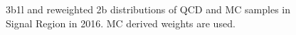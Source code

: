 \begin{figure}[ht]
 

    \caption{3b1l and reweighted 2b distributions of QCD and \ttbar MC samples in Signal Region in 2016.
             MC derived weights are used.}
    \label{fig:mc-weights-3b1l-SR-2016}
\end{figure}


